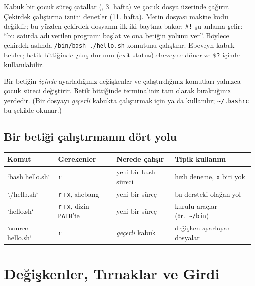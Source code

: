 Kabuk bir çocuk süreç çatallar (, 3. hafta) ve çocuk dosya üzerinde  çağırır. Çekirdek çalıştırma iznini denetler (11. hafta). Metin dosyası makine kodu değildir; bu yüzden çekirdek dosyanın ilk iki baytına bakar: \texttt{\#!} şu anlama gelir: “bu satırda adı verilen programı başlat ve ona betiğin yolunu ver”. Böylece çekirdek aslında \texttt{/bin/bash ./hello.sh} komutunu çalıştırır. Ebeveyn kabuk bekler; betik bittiğinde çıkış durumu (exit status) ebeveyne döner ve \texttt{\$?} içinde kullanılabilir.

\begin{keyidea}
Bir betiğin \emph{içinde} ayarladığınız değişkenler ve çalıştırdığınız  komutları yalnızca çocuk süreci değiştirir. Betik bittiğinde terminaliniz tam olarak bıraktığınız yerdedir. (Bir dosyayı \emph{geçerli} kabukta çalıştırmak için  ya da  kullanılır; \texttt{\textasciitilde/.bashrc} bu şekilde okunur.)
\end{keyidea}

\subsection{Bir betiği çalıştırmanın dört yolu}

\begin{center}
\small
\begin{tabular}{@{}llll@{}}
\toprule
\textbf{Komut} & \textbf{Gerekenler} & \textbf{Nerede çalışır} & \textbf{Tipik kullanım}\\
\midrule
`bash hello.sh` & \texttt{r} & yeni bir bash süreci & hızlı deneme, \texttt{x} biti yok\\
`./hello.sh` & \texttt{r}+\texttt{x}, shebang & yeni bir süreç & bu dersteki olağan yol\\
`hello.sh` & \texttt{r}+\texttt{x}, dizin \texttt{PATH}'te & yeni bir süreç & kurulu araçlar (ör.\ \texttt{\textasciitilde/bin})\\
`source hello.sh` & \texttt{r} & \emph{geçerli} kabuk & değişken ayarlayan dosyalar\\
\bottomrule
\end{tabular}
\end{center}

\section{Değişkenler, Tırnaklar ve Girdi}

